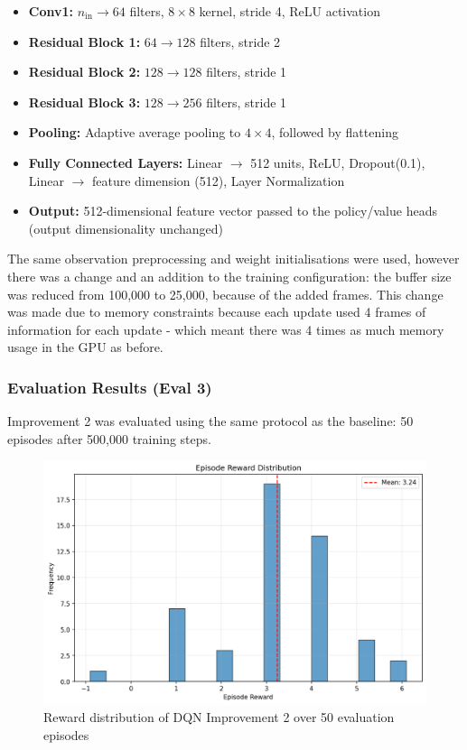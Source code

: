 \documentclass[twocolumn]{article}
\begin{document}
\begin{itemize}
	\item \textbf{Conv1:} $n_\text{in} \rightarrow 64$ filters, $8 \times 8$ kernel, stride 4, ReLU activation
	\item \textbf{Residual Block 1:} $64 \rightarrow 128$ filters, stride 2
	\item \textbf{Residual Block 2:} $128 \rightarrow 128$ filters, stride 1
	\item \textbf{Residual Block 3:} $128 \rightarrow 256$ filters, stride 1
	\item \textbf{Pooling:} Adaptive average pooling to $4 \times 4$, followed by flattening
	\item \textbf{Fully Connected Layers:} Linear $\rightarrow$ 512 units, ReLU, Dropout(0.1), Linear $\rightarrow$ feature dimension (512), Layer Normalization
	\item \textbf{Output:} 512-dimensional feature vector passed to the policy/value heads (output dimensionality unchanged)
\end{itemize}

The same observation preprocessing and weight initialisations were used, however there was a change and an addition to the training configuration: the buffer size was reduced from 100,000 to 25,000, because of the added frames. This change was made due to memory constraints because each update used 4 frames of information for each update - which meant there was 4 times as much memory usage in the GPU as before. 

\subsubsection*{Evaluation Results (Eval 3)}

Improvement 2 was evaluated using the same protocol as the baseline: 50 episodes after 500,000 training steps.
\begin{figure}[H]
	\centering
	\includegraphics[width=0.8\linewidth]{images/DQNImprov2reward_distribution.png}
	\caption{Reward distribution of DQN Improvement 2 over 50 evaluation episodes}
	\label{fig:dqn_improv2_reward}
\end{figure}
\end{document}

